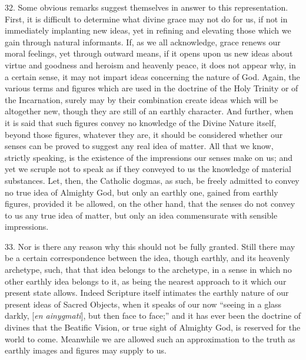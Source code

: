32. Some obvious remarks suggest themselves in answer to this
representation. First, it is difficult to determine what divine grace
may not do for us, if not in immediately implanting new ideas, yet in
refining and elevating those which we gain through natural informants.
If, as we all acknowledge, grace renews our moral feelings, yet
through outward means, if it opens upon us new ideas about virtue and
goodness and heroism and heavenly peace, it does not appear why, in a
certain sense, it may not impart ideas concerning the nature of God.
Again, the various terms and figures which are used in the doctrine of
the Holy Trinity or of the Incarnation, surely may by their
combination create ideas which will be altogether new, though they are
still of an earthly character. And further, when it is said that such
figures convey no knowledge of the Divine Nature itself, beyond those
figures, whatever they are, it should be considered whether our senses
can be proved to suggest any real idea of matter. All that we know,
strictly speaking, is the existence of the impressions our senses make
on us; and yet we scruple not to speak as if they conveyed to us the
knowledge of material substances. Let, then, the Catholic dogmas, as
such, be freely admitted to convey no true idea of Almighty God, but
only an earthly one, gained from earthly figures, provided it be
allowed, on the other hand, that the senses do not convey to us any
true idea of matter, but only an idea commensurate with sensible
impressions.

33. Nor is there any reason why this should not be fully granted.
Still there may be a certain correspondence between the idea, though
earthly, and its heavenly archetype, such, that that idea belongs to
the archetype, in a sense in which no other earthly idea belongs to
it, as being the nearest approach to it which our present state
allows. Indeed Scripture itself intimates the earthly nature of our
present ideas of Sacred Objects, when it speaks of our now
``seeing in a glass darkly, [\emph{en
ainygmati}], but
then face to face;'' and it has ever been the doctrine of divines
that the Beatific Vision, or true sight of Almighty God, is reserved
for the world to come. Meanwhile we are allowed such an approximation
to the truth as earthly images and figures may supply to us.

